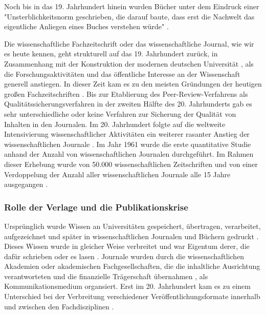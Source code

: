 Noch bis in das 19. Jahrhundert hinein wurden Bücher unter dem Eindruck einer "Unsterblichkeitsnorm geschrieben, die darauf baute, dass erst die Nachwelt das eigentliche Anliegen eines Buches verstehen würde" \cite{hagner_2015_sache_buches}.

Die wissenschaftliche Fachzeitschrift oder das wissenschaftliche Journal, wie wir es heute kennen, geht strukturell auf das 19. Jahrhundert zurück, in Zusammenhang mit der Konstruktion der modernen deutschen Universität \cite{Paletschek_2002}, als die Forschungsaktivitäten und das öffentliche Interesse an der Wissenschaft generell anstiegen. In dieser Zeit kam es zu den meisten Gründungen der heutigen großen Fachzeitschriften \cite{porter_1964_scientific}. Bis zur Etablierung des Peer-Review-Verfahrens als Qualitätssicherungsverfahren in der zweiten Hälfte des 20. Jahrhunderts gab es sehr unterschiedliche oder keine Verfahren zur Sicherung der Qualität von Inhalten in den Journalen. Im 20. Jahrhundert folgte auf die weltweite Intensivierung wissenschaftlicher Aktivitäten ein weiterer rasanter Anstieg der wissenschaftlichen Journale \cite[:23]{haustein_2012_multidimensional}. Im Jahr 1961 wurde die erste quantitative Studie anhand der Anzahl von wissenschaftlichen Journalen durchgeführt. Im Rahmen dieser Erhebung wurde von 50.000 wissenschaftlichen Zeitschriften und von einer Verdoppelung der Anzahl aller wissenschaftlichen Journale alle 15 Jahre ausgegangen \cite{de_1982_little}.

\subsubsection{Rolle der Verlage und die Publikationskrise}

Ursprünglich wurde Wissen an Universitäten gespeichert, übertragen, verarbeitet, aufgezeichnet und später in wissenschaftlichen Journalen und Büchern gedruckt \cite{kittler_2004}. Dieses Wissen wurde in gleicher Weise verbreitet \cite{hagner_2015_sache_buches} und war Eigentum derer, die dafür schrieben oder es lasen \cite{epaa_Weiner_2001}. Journale wurden durch die wissenschaftlichen Akademien oder akademischen Fachgesellschaften, die die inhaltliche Ausrichtung verantworteten und die finanzielle Trägerschaft übernahmen \cite{epaa_Weiner_2001}, als Kommunikationsmedium organsiert. Erst im 20. Jahrhundert kam es zu einem Unterschied bei der Verbreitung verschiedener Veröffentlichungsformate innerhalb und zwischen den Fachdisziplinen \cite{hagner_2015_sache_buches}.

